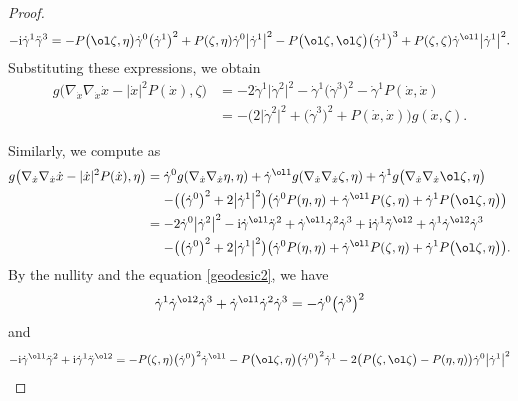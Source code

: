 \begin{proof}
\begin{gather*}
-{\rm i}\dot\gamma^1\ddot\gamma^3=-P\bigl(\ol\zeta, \eta\bigr)\dot\gamma^0\bigl(\dot\gamma^1\bigr)^2+P(\zeta, \eta)\dot\gamma^0\bigl|\dot\gamma^{1}\bigr|^2
-P\bigl(\ol\zeta, \ol\zeta\bigr)\bigl(\dot\gamma^1\bigr)^3+P(\zeta, \zeta)\dot\gamma^{\ol1}\bigl|\dot\gamma^{1}\bigr|^2.
\end{gather*}
Substituting these expressions, we obtain
\begin{align*}
g\bigl(\nabla_{\dot x}\nabla_{\dot x}\dot x-|\dot x|^2P(\dot x) ,\zeta\bigr)
&=-2\dot\gamma^1\bigl|\dot\gamma^2\bigr|^2-\dot\gamma^1\bigl(\dot\gamma^3\bigr)^2-\dot\gamma^1P(\dot x, \dot x) \\
&=-\bigl(2\bigl|\dot\gamma^2\bigr|^2+\bigl(\dot\gamma^3\bigr)^2+P(\dot x, \dot x)\bigr)g(\dot x, \zeta).
\end{align*}

Similarly, we compute as
\begin{align*}
g\bigl(\nabla_{\dot x}\nabla_{\dot x}\dot x-|\dot x|^2P(\dot x) ,\eta\bigr)
={}&\dot\gamma^0g(\nabla_{\dot x}\nabla_{\dot x}\eta, \eta)+
\dot\gamma^{\ol1}g(\nabla_{\dot x}\nabla_{\dot x}\zeta, \eta)+\dot\gamma^1g\bigl(\nabla_{\dot x}\nabla_{\dot x}\ol\zeta, \eta\bigr) \\
&{}{-}\bigl(\bigl(\dot\gamma^0\bigr)^2+2\bigl|\dot\gamma^1\bigr|^2\bigr)\bigl(\dot\gamma^0P(\eta, \eta)+\dot\gamma^{\ol1}P(\zeta, \eta)+\dot\gamma^1P\bigl(\ol\zeta, \eta\bigr)\bigr) \\
={}&{-}2\dot\gamma^0\bigl|\dot\gamma^2\bigr|^2-{\rm i}\dot\gamma^{\ol1}\ddot\gamma^2
+\dot\gamma^{\ol1}\dot\gamma^2\dot\gamma^3+{\rm i}\dot\gamma^1\ddot\gamma^{\ol2}+\dot\gamma^1\dot\gamma^{\ol2}\dot\gamma^3 \\
&{}{-}\bigl(\bigl(\dot\gamma^0\bigr)^2+2\bigl|\dot\gamma^1\bigr|^2\bigr)\bigl(\dot\gamma^0P(\eta, \eta)+\dot\gamma^{\ol1}P(\zeta, \eta)+\dot\gamma^1P\bigl(\ol\zeta, \eta\bigr)\bigr).
\end{align*}
By the nullity and the equation \eqref{geodesic2}, we have
\begin{align*}
\dot\gamma^1\dot\gamma^{\ol2}\dot\gamma^3+\dot\gamma^{\ol1}\dot\gamma^2\dot\gamma^3 =-\dot\gamma^0\bigl(\dot\gamma^3\bigr)^2
\end{align*}
and
\begin{align*}
-{\rm i}\dot\gamma^{\ol1}\ddot\gamma^2+{\rm i}\dot\gamma^1\ddot\gamma^{\ol2}
={}&{-}P(\zeta, \eta)\bigl(\dot\gamma^0\bigr)^2\dot\gamma^{\ol1} -P\bigl(\ol\zeta, \eta\bigr)\bigl(\dot\gamma^0\bigr)^2\dot\gamma^1-2\bigl(P\bigl(\zeta, \ol\zeta\bigr)-P(\eta, \eta)\bigr)
\dot\gamma^0\bigl|\dot\gamma^1\bigr|^2\\

\end{align*}
\end{proof}
